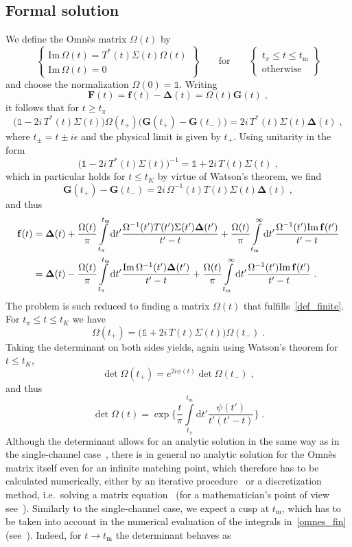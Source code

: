 \documentclass[11pt]{article}%
\providecommand{\ec}{\;,}
\providecommand{\ep}{\;.}
\providecommand{\nt}{\notag}
\newcommand{\diff}{\text{d}}
\newcommand{\unity}{\mathds{1}}
\newcommand{\tpi}{t_\pi}
\newcommand{\tK}{t_K}
\newcommand{\tm}{t_\text{m}}
\newcommand{\ff}{\mathbf{f}}
\newcommand{\FF}{\mathbf{F}}
\newcommand{\GG}{\mathbf{G}}
\newcommand{\Del}{\boldsymbol{\Delta}}
\newcommand{\beq}{\begin{equation}}
\newcommand{\eeq}{\end{equation}}
\renewcommand{\Im}{\text{Im}\,}
\providecommand{\unity}{\mathds{1}}
\begin{document}
\subsection{Formal solution}

We define the Omn\`es matrix $\Omega(t)$ by
\beq
\label{def_finite}
\begin{Bmatrix}\Im \Omega(t)=T^*(t)\Sigma(t)\Omega(t) \\ \Im \Omega(t)=0\end{Bmatrix}
\qquad \text{for} \qquad
\begin{Bmatrix}\tpi\leq t \leq \tm \\ \text{otherwise}\end{Bmatrix}
\eeq
and choose the normalization $\Omega(0)=\unity$. Writing
\beq
\FF(t)=\ff(t)-\Del(t)=\Omega(t)\GG(t)\ec
\eeq
it follows that for $t\geq \tpi$ 
\beq
\big(\unity-2i\, T^*(t)\Sigma(t)\big)\Omega(t_+)\big(\GG(t_+)-\GG(t_-)\big)=2i\,T^*(t)\Sigma(t)\Del(t)\ec
\eeq
where $t_\pm=t\pm i\epsilon$ and the physical limit is given by $t_+$.
Using unitarity in the form
\beq
\big(\unity-2i\, T^*(t)\Sigma(t)\big)^{-1}=\unity+2i\,T(t)\Sigma(t)\ec
\eeq
which in particular holds for $t\leq \tK$ by virtue of Watson's theorem,
we find
\beq
\GG(t_+)-\GG(t_-)=2i\,\Omega^{-1}(t)T(t)\Sigma(t)\Del(t)\ec
\eeq
and thus
\begin{align}
\label{omnes_fin}
\ff(t)&=\Del(t)+\frac{\Omega(t)}{\pi}\int\limits_{\tpi}^{\tm}\diff t'\frac{\Omega^{-1}(t')T(t')\Sigma(t')\Del(t')}{t'-t}+
\frac{\Omega(t)}{\pi}\int\limits_{\tm}^\infty\diff t'\frac{\Omega^{-1}(t')\Im \ff(t')}{t'-t}\nt\\
&=\Del(t)-\frac{\Omega(t)}{\pi}\int\limits_{\tpi}^{\tm}\diff t'\frac{\Im\Omega^{-1}(t')\Del(t')}{t'-t}+
\frac{\Omega(t)}{\pi}\int\limits_{\tm}^\infty\diff t'\frac{\Omega^{-1}(t')\Im \ff(t')}{t'-t}\ep
\end{align}
The problem is such reduced to finding a matrix $\Omega(t)$ that fulfills~\eqref{def_finite}. For $\tpi\leq t\leq \tK$ we have
\beq
\Omega(t_+)=\big(\unity+2i\,T(t)\Sigma(t)\big)\Omega(t_-)\ep
\eeq
Taking the determinant on both sides yields, again using Watson's theorem for $t\leq \tK$,
\beq
\det \Omega(t_+)=e^{2i\psi(t)}\det\Omega(t_-)\ec
\eeq
and thus~\cite{Moussallam99}
\beq
\label{det_fin}
\det \Omega(t)=\exp\Bigg\{\frac{t}{\pi}\int\limits_{\tpi}^{\tm}\diff t'\frac{\psi(t')}{t'(t'-t)}\Bigg\}\ep
\eeq
Although the determinant allows for an analytic solution in the same way as in the single-channel case~\cite{Omnes}, there is in general no analytic solution for the Omn\`es matrix itself even for an infinite matching point, which therefore has to be calculated numerically, either by an iterative procedure~\cite{DGL90} or a discretization method, i.e.\ solving a matrix equation~\cite{Moussallam99,SDG_diss} (for a mathematician's point of view see~\cite{Muskhelishvili}). Similarly to the single-channel case, we expect a cusp at $\tm$, which has to be taken into account in the numerical evaluation of the integrals in~\eqref{omnes_fin} (see~\cite{BDM04,RS_DHKM}). Indeed, for $t\to\tm$ the determinant behaves as
\end{document}
